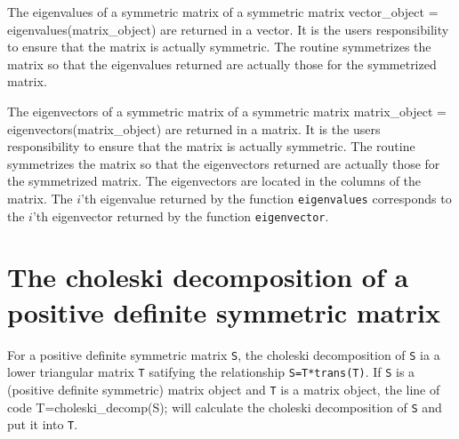\documentclass[12pt]{book}
\begin{document}
The eigenvalues of a symmetric matrix 
 {of a symmetric matrix}
\beginexample
vector_object = eigenvalues(matrix_object)
\endexample
\noindent are returned in a vector. It is the users responsibility to 
ensure that the matrix is actually symmetric. The routine symmetrizes 
the matrix so that the eigenvalues returned are actually those for
the symmetrized matrix.

The eigenvectors of a symmetric matrix 
 {of a symmetric matrix}
\beginexample
matrix_object = eigenvectors(matrix_object)
\endexample
\noindent are returned in a matrix. It is the users responsibility to 
ensure that the matrix is actually symmetric. The routine symmetrizes 
the matrix so that the eigenvectors returned are actually those for
the symmetrized matrix. The eigenvectors are located in the
columns of the matrix. The $i$'th eigenvalue returned by the
function {\tt eigenvalues} corresponds to the $i$'th eigenvector  
returned by the function {\tt eigenvector}.

\section{The choleski decomposition of a positive definite symmetric matrix}
For a positive definite symmetric matrix {\tt S}, the
choleski decomposition of {\tt S} ia a lower triangular matrix {\tt T}
satifying the relationship {\tt S=T*trans(T)}. 
If {\tt S} is a (positive definite symmetric) matrix object and
{\tt T} is a matrix object, the line of code
\beginexample
T=choleski_decomp(S);
\endexample
\noindent will calculate the choleski decomposition of {\tt S} and put it
into {\tt T}.
\end{document}
